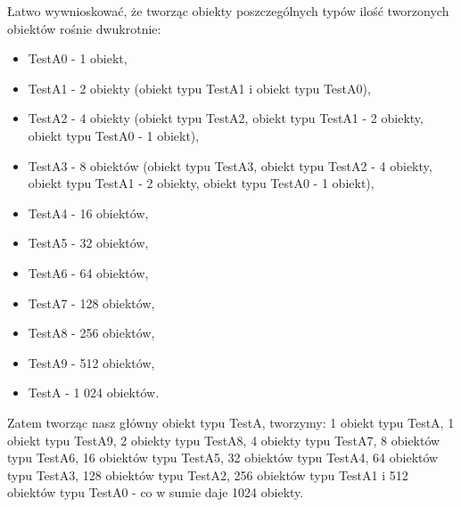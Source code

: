 \documentclass[12pt]{article}
\begin{document}
Łatwo wywnioskować, że tworząc obiekty poszczególnych typów ilość tworzonych obiektów rośnie dwukrotnie:
\begin{itemize}
	\item TestA0 - 1 obiekt,
	\item TestA1 - 2 obiekty (obiekt typu TestA1 i obiekt typu TestA0),
	\item TestA2 - 4 obiekty (obiekt typu TestA2, obiekt typu TestA1 - 2 obiekty, obiekt typu TestA0 - 1 obiekt),
	\item TestA3 - 8 obiektów (obiekt typu TestA3, obiekt typu TestA2 - 4 obiekty, obiekt typu TestA1 - 2 obiekty, obiekt typu TestA0 - 1 obiekt),
	\item TestA4 - 16 obiektów,
	\item TestA5 - 32 obiektów,
	\item TestA6 - 64 obiektów,
	\item TestA7 - 128 obiektów,
	\item TestA8 - 256 obiektów,
	\item TestA9 - 512 obiektów,
	\item TestA - 1 024 obiektów.
\end{itemize}
Zatem tworząc nasz główny obiekt typu TestA, tworzymy: 1 obiekt typu TestA, 1 obiekt typu TestA9, 2 obiekty typu TestA8, 4 obiekty typu TestA7, 8 obiektów typu TestA6, 16 obiektów typu TestA5, 32 obiektów typu TestA4, 64 obiektów typu TestA3, 128 obiektów typu TestA2, 256 obiektów typu TestA1 i 512 obiektów typu TestA0 - co w sumie daje 1024 obiekty.
\end{document}
